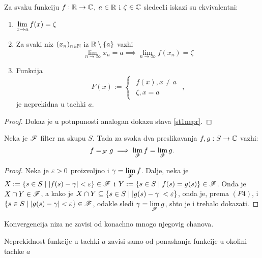 \documentclass[../main_og.tex]{subfiles}
\begin{document}
    \begin{st}\label{st1nepr} 
        Za svaku funkciju $f:\mathbb{R} \to \mathbb{C}$, $a\in \mathbb{R}$ i $\zeta \in \mathbb{C}$ sledec1i iskazi su ekvivalentni:
    \begin{enumerate}
        \item $\displaystyle{\lim_{x\to a}f(x)=\zeta}$
        \item Za svaki niz $(x_n)_{n\in \mathbb{N}}$ iz $\mathbb{R}\setminus\{a\}$ vazhi \[\lim_{n \to \infty}x_n=a \implies \lim_{n \to \infty}f(x_n)=\zeta \]
        \item Funkcija \[
                F(x):=
            \begin{cases}
                \begin{aligned}
                    f(x), x\neq a\\
                \zeta, x=a

                    \end{aligned}
                            \end{cases},
            \]
            je neprekidna u tachki $a$.
        \end{enumerate}
    
    
    \end{st}
    \begin{proof}
        Dokaz je u potnpunosti analogan dokazu stava \ref{st1nepr}.
    \end{proof}
    \begin{tvr}
        Neka je $\mathscr{F}$ filter na skupu $S$. Tada za svaka dva preslikavanja $f,g : S\to \mathbb{C}$ vazhi: \[f=_{\mathscr{F}} g\implies \lim_{\mathscr{F}} f=\lim_{\mathscr{F}} g.\]
    \end{tvr}

    \begin{proof}
        Neka je $\varepsilon>0$ proizvoljno i $\displaystyle{\gamma=\lim_{\mathscr{F}}f}$. Dalje, neka je $X:=\{s\in S\mid |f(s)-\gamma|<\varepsilon\}\in \mathscr{F}$ i $Y:=\{s \in S \mid f(s)=g(s)\} \in \mathscr{F}$. 
	Onda je $X \cap Y \in \mathscr{F}$, a kako je $X\cap Y\subseteq \{s \in S \mid |g(s)-\gamma|<\varepsilon\}$, onda je, prema $(F4)$, i $ \{s \in S \mid |g(s)-\gamma|<\varepsilon\}\in \mathscr{F}$,
	odakle sledi $\gamma=\displaystyle{\lim_{\mathscr{F}}g}$, shto je i trebalo dokazati.
    \end{proof}

    \begin{posl}

        Konvergencija niza ne zavisi od konachno mnogo njegovig chanova.

    \end{posl}
    \begin{posl}
        Neprekidnost funkcije u tachki $a$ zavisi samo od ponashanja funkcije u okolini tachke $a$
    \end{posl}
\end{document}
